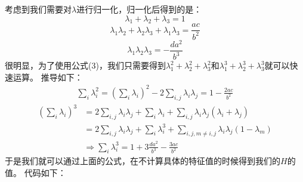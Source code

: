 \documentclass{article}
\begin{document}
考虑到我们需要对\(\lambda\)进行归一化，归一化后得到的是：
\begin{equation}
\lambda_1 + \lambda_2 + \lambda_3 = 1
\end{equation}
\begin{equation}
\lambda_1\lambda_2 + \lambda_2\lambda_3 +\lambda_1 \lambda_3 = \frac{ac}{b^2}
\end{equation}
\begin{equation}
\lambda_1\lambda_2\lambda_3 = -\frac{da^2}{b^3}
\end{equation}
很明显，为了使用公式(3)，我们只需要得到\(\lambda_1^2 + \lambda_2^2 + \lambda_3^2\)和\(\lambda_1^3 + \lambda_2^3 + \lambda_3^3\)就可以快速运算。
推导如下：
\begin{equation}
\begin{aligned}
\sum_i\lambda_i^2 = \left(\sum_i\lambda_i\right)^2 - 2\sum_{i,j}\lambda_i\lambda_j = 1 - \frac{2ac}{b^2}
\end{aligned}
\end{equation}
\begin{equation}
\begin{aligned}
(\sum_i\lambda_i)^3 &= 2\sum_{i,j}\lambda_i\lambda_j + \sum_i\lambda_i + \sum_{i,j}\lambda_i\lambda_j(\lambda_i+\lambda_j) \\
& = 2\sum_{i,j}\lambda_i\lambda_j + \sum_i\lambda_i^3 + \sum_{i,j,m\neq i,j}\lambda_i\lambda_j(1 - \lambda_m)\\
&\Rightarrow \sum_i\lambda_i^3 = 1 + 3 \frac{da^2}{b^3} - \frac{3ac}{b^2}
\end{aligned}
\end{equation}
于是我们就可以通过上面的公式，在不计算具体的特征值的时候得到我们的\(H\)的值。
代码如下：
\end{document}
